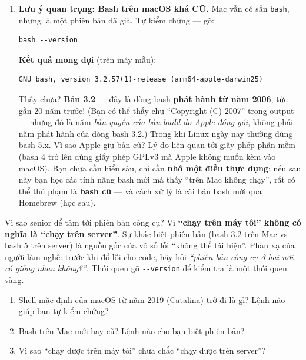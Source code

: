 \documentclass[12pt,a4paper]{article}
\begin{document}
\begin{enumerate}[leftmargin=*]
  \item \textbf{Lưu ý quan trọng: Bash trên macOS khá CŨ.} Mac vẫn có sẵn \texttt{bash}, nhưng là một phiên bản đã già. Tự kiểm chứng — gõ:
  \begin{labbox}[Lệnh]
\begin{verbatim}
bash --version
\end{verbatim}
  \end{labbox}
  \textbf{Kết quả mong đợi} (trên máy mẫu):
  \begin{termbox}
\begin{verbatim}
GNU bash, version 3.2.57(1)-release (arm64-apple-darwin25)
\end{verbatim}
  \end{termbox}
  Thấy chưa? \textbf{Bản 3.2} — đây là dòng bash \textbf{phát hành từ năm 2006}, tức gần 20 năm trước! (Bạn có thể thấy chữ ``Copyright (C) 2007'' trong output — nhưng đó là năm \textit{bản quyền của bản build do Apple đóng gói}, không phải năm phát hành của dòng bash 3.2.) Trong khi Linux ngày nay thường dùng bash 5.x. Vì sao Apple giữ bản cũ? Lý do liên quan tới giấy phép phần mềm (bash 4 trở lên dùng giấy phép GPLv3 mà Apple không muốn kèm vào macOS). Bạn chưa cần hiểu sâu, chỉ cần \textbf{nhớ một điều thực dụng}: nếu sau này bạn học các tính năng bash mới mà thấy ``trên Mac không chạy'', rất có thể thủ phạm là \textbf{bash cũ} — và cách xử lý là cài bản bash mới qua Homebrew (học sau).
\end{enumerate}

\begin{seniorbox}
Vì sao senior để tâm tới phiên bản công cụ? Vì \textbf{``chạy trên máy tôi'' không có nghĩa là ``chạy trên server''}. Sự khác biệt phiên bản (bash 3.2 trên Mac vs bash 5 trên server) là nguồn gốc của vô số lỗi ``không thể tái hiện''. Phản xạ của người làm nghề: trước khi đổ lỗi cho code, hãy hỏi \textit{``phiên bản công cụ ở hai nơi có giống nhau không?''}. Thói quen gõ \texttt{-{}-version} để kiểm tra là một thói quen vàng.
\end{seniorbox}

\begin{quizbox}
\begin{enumerate}[leftmargin=*]
  \item Shell mặc định của macOS từ năm 2019 (Catalina) trở đi là gì? Lệnh nào giúp bạn tự kiểm chứng?
  \item Bash trên Mac mới hay cũ? Lệnh nào cho bạn biết phiên bản?
  \item Vì sao ``chạy được trên máy tôi'' chưa chắc ``chạy được trên server''?
\end{enumerate}
\end{quizbox}
\end{document}

